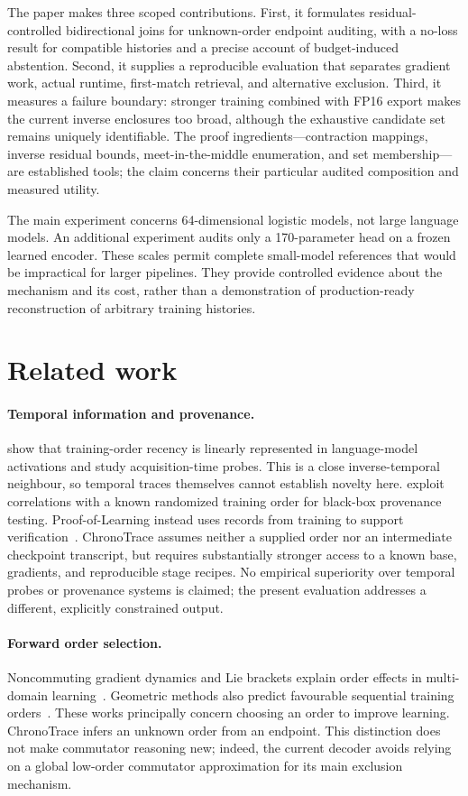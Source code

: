 The paper makes three scoped contributions. First, it formulates residual-controlled bidirectional joins for unknown-order endpoint auditing, with a no-loss result for compatible histories and a precise account of budget-induced abstention. Second, it supplies a reproducible evaluation that separates gradient work, actual runtime, first-match retrieval, and alternative exclusion. Third, it measures a failure boundary: stronger training combined with FP16 export makes the current inverse enclosures too broad, although the exhaustive candidate set remains uniquely identifiable. The proof ingredients---contraction mappings, inverse residual bounds, meet-in-the-middle enumeration, and set membership---are established tools; the claim concerns their particular audited composition and measured utility.

The main experiment concerns 64-dimensional logistic models, not large language models. An additional experiment audits only a 170-parameter head on a frozen learned encoder. These scales permit complete small-model references that would be impractical for larger pipelines. They provide controlled evidence about the mechanism and its cost, rather than a demonstration of production-ready reconstruction of arbitrary training histories.

\section{Related work}
\paragraph{Temporal information and provenance.}
\citet{fresh2025} show that training-order recency is linearly represented in language-model activations and study acquisition-time probes. This is a close inverse-temporal neighbour, so temporal traces themselves cannot establish novelty here. \citet{palimpsest2025} exploit correlations with a known randomized training order for black-box provenance testing. Proof-of-Learning instead uses records from training to support verification~\cite{jia2021}. ChronoTrace assumes neither a supplied order nor an intermediate checkpoint transcript, but requires substantially stronger access to a known base, gradients, and reproducible stage recipes. No empirical superiority over temporal probes or provenance systems is claimed; the present evaluation addresses a different, explicitly constrained output.

\paragraph{Forward order selection.}
Noncommuting gradient dynamics and Lie brackets explain order effects in multi-domain learning~\cite{rukhovich2025}. Geometric methods also predict favourable sequential training orders~\cite{sweeney2026}. These works principally concern choosing an order to improve learning. ChronoTrace infers an unknown order from an endpoint. This distinction does not make commutator reasoning new; indeed, the current decoder avoids relying on a global low-order commutator approximation for its main exclusion mechanism.

